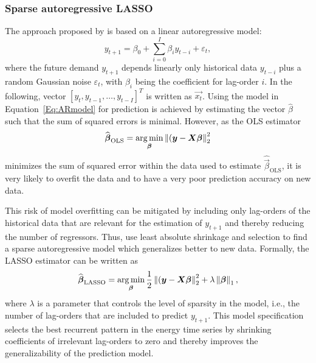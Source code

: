 \subsubsection{Sparse autoregressive LASSO}

The approach proposed by \citet{Li:2017} is based on a linear autoregressive model:
%
\begin{equation} \label{Eq:ARmodel}
    y_{t+1}=\beta_0+\sum_{i=0}^I\beta_iy_{t-i}+\varepsilon_t,
\end{equation}
%
where the future demand $y_{t+1}$ depends linearly only historical data $y_{t-i}$ plus a random Gaussian noise $\varepsilon_t$, with $\beta_i$ being the coefficient for lag-order $i$. In the following, vector $\left[y_t, y_{t-1}, \dots, y_{t-I}\right]^T$ is written as $\vec{x_t}$. Using the model in Equation~\ref{Eq:ARmodel} for prediction is achieved by estimating the vector $\widehat{\beta}$ such that the sum of squared errors is minimal. However, as the OLS estimator
%
\begin{equation} \label{Eq:betaOLS}
    \widehat{\boldsymbol{\beta}}_{\text{OLS}}=\operatorname*{\arg\min}_{\boldsymbol{\beta}}\left\lVert(\boldsymbol{y}-\boldsymbol{X}\boldsymbol{\beta}\right\rVert^2_2
\end{equation}
%
minimizes the sum of squared error within the data used to estimate $\widehat{\vec{\beta}}_{\text{OLS}}$, it is very likely to overfit the data and to have a very poor prediction accuracy on new data.

This risk of model overfitting can be mitigated by including only lag-orders of the historical data that are relevant for the estimation of $y_{t+1}$ and thereby reducing the number of regressors. Thus, \citet{Li:2017} use least absolute shrinkage and selection to find a sparse autoregressive model which generalizes better to new data. Formally, the LASSO estimator can be written as
%
\begin{equation} \label{Eq:betaLASSO}
    \widehat{\boldsymbol{\beta}}_{\text{LASSO}}=\operatorname*{\arg\min}_{\boldsymbol{\beta}}\frac{1}{2}\left\lVert(\boldsymbol{y}-\boldsymbol{X}\boldsymbol{\beta}\right\rVert^2_2+\lambda\left\lVert\boldsymbol{\beta}\right\rVert_1,
\end{equation}
%
where $\lambda$ is a parameter that controls the level of sparsity in the model, i.e., the number of lag-orders that are included to predict $y_{t+1}$. This model specification selects the best recurrent pattern in the energy time series by shrinking coefficients of irrelevant lag-orders to zero and thereby improves the generalizability of the prediction model.




